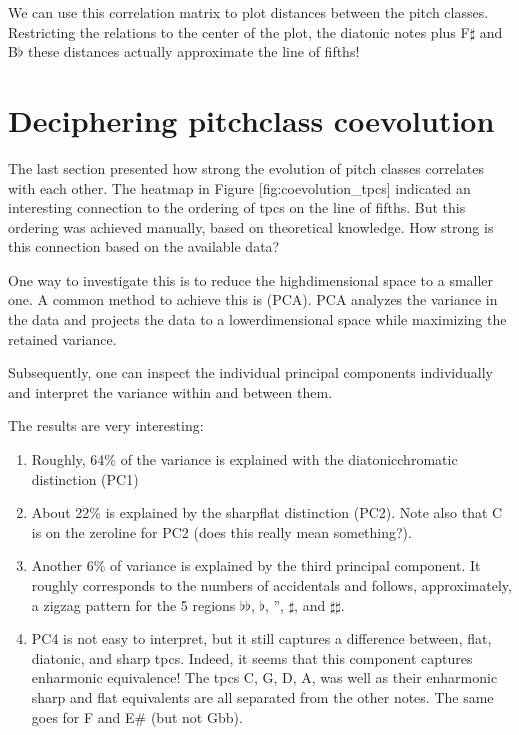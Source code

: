 \documentclass[letterpaper,10pt,english]{sphinxmanual}
\begin{document}
\sphinxAtStartPar
We can use this correlation matrix to plot distances between the pitch
classes. Restricting the relations to the center of the plot, the
diatonic notes plus F\(\sharp\) and B\(\flat\) these
distances actually approximate the line of fifths!


\section{Deciphering pitch\sphinxhyphen{}class coevolution}
\label{\detokenize{coevolution:deciphering-pitch-class-coevolution}}
\sphinxAtStartPar
The last section presented how strong the evolution of pitch classes
correlates with each other. The heatmap in Figure
{[}fig:coevolution\_tpcs{]} indicated an interesting connection to the
ordering of tpcs on the line of fifths. But this ordering was achieved
manually, based on theoretical knowledge. How strong is this connection
based on the available data?

\sphinxAtStartPar
One way to investigate this is to reduce the high\sphinxhyphen{}dimensional space to a
smaller one. A common method to achieve this is  (PCA). PCA analyzes the variance in the data and projects the
data to a lower\sphinxhyphen{}dimensional space while maximizing the retained
variance.

\sphinxAtStartPar
Subsequently, one can inspect the individual principal components
individually and interpret the variance within and between them.

\sphinxAtStartPar
The results are very interesting:
\begin{enumerate}
%
\item {} 
\sphinxAtStartPar
Roughly, 64\% of the variance is explained with the diatonic\sphinxhyphen{}chromatic
distinction (PC1)

\item {} 
\sphinxAtStartPar
About 22\% is explained by the sharp\sphinxhyphen{}flat distinction (PC2). Note also
that C is on the zero\sphinxhyphen{}line for PC2 (does this really mean
something?).

\item {} 
\sphinxAtStartPar
Another 6\% of variance is explained by the third principal component.
It roughly corresponds to the numbers of accidentals and follows,
approximately, a zig\sphinxhyphen{}zag pattern for the 5 regions
\(\flat\flat\), \(\flat\), ”, \(\sharp\), and
\(\sharp\sharp\).

\item {} 
\sphinxAtStartPar
PC4 is not easy to interpret, but it still captures a difference
between, flat, diatonic, and sharp tpcs. Indeed, it seems that this
component captures enharmonic equivalence! The tpcs C, G, D, A, was
well as their enharmonic sharp and flat equivalents are all separated
from the other notes. The same goes for F and E\# (but not Gbb).

\end{enumerate}
\end{document}
